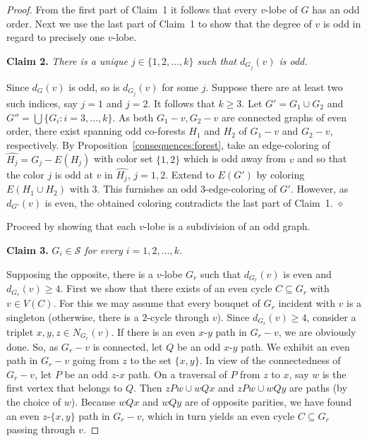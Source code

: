 \documentclass[a4paper,12pt]{article}
\numberwithin{equation}{section}
\begin{document}
\begin{proof}
From the first part of Claim~1 it follows that every $v$-lobe of $G$ has an odd order. Next we use the last part of Claim~1 to show that the degree of $v$ is odd in regard to precisely one $v$-lobe.


\bigskip

\noindent \textbf{Claim 2.} \textit{There is a unique $j\in\{1,2,\ldots,k\}$ such that $d_{G_j}(v)$ is odd.}

\medskip

\noindent Since $d_G(v)$ is odd, so is $d_{G_j}(v)$ for some $j$. Suppose there are at least two such indices, say $j=1$ and $j=2$. It follows that $k\geq3$. Let $G'=G_{1}\cup G_{2}$ and $G''=\bigcup\{G_i:i=3,\ldots,k\}$. As both $G_1-v,G_2-v$ are connected graphs of even order, there exist spanning odd co-forests $H_1$ and $H_2$ of $G_1-v$ and $G_2-v$, respectively. By Proposition~\ref{consequences:forest}, take an edge-coloring of $\hat{H_j}=G_j-E(H_j)$ with color set $\{1,2\}$ which is odd away from $v$ and so that the color $j$ is odd at $v$ in $\hat{H_j}$, $j=1,2$.
Extend to $E(G')$ by coloring $E(H_1\cup H_2)$ with $3$. This furnishes an odd $3$-edge-coloring of $G'$. However, as $d_{G'}(v)$ is even, the obtained coloring contradicts the last part of Claim~1. \hfill$\diamond$


\bigskip

Proceed by showing that each $v$-lobe is a subdivision of an odd graph.

\bigskip

\noindent \textbf{Claim 3.} \textit{$G_i\in \mathcal{S}$ for every $i=1,2,\ldots,k$.}

\medskip

\noindent Supposing the opposite, there is a $v$-lobe $G_r$ such that $d_{G_r}(v)$ is even and $d_{G_r}(v)\geq4$. First we show that there exists of an even cycle $C\subseteq G_r$ with $v\in V(C)$. For this we may assume that every bouquet of $G_r$ incident with $v$ is a singleton (otherwise, there is a $2$-cycle through $v$). Since $d_{G_r}(v)\geq4$, consider a triplet $x,y,z\in N_{G_r}(v)$. If there is an even $x$-$y$ path in $G_r-v$, we are obviously done. So, as $G_r-v$ is connected, let $Q$ be an odd $x$-$y$ path. We exhibit an even path in $G_r-v$ going from $z$ to the set $\{x,y\}$.  In view of the connectedness of $G_r-v$, let $P$ be an odd $z$-$x$ path. On a traversal of $P$ from $z$ to $x$, say $w$ is the first vertex that belongs to $Q$.  Then $zPw\cup wQx$ and $zPw\cup wQy$ are paths (by the choice of $w$). Because $wQx$ and $wQy$ are of opposite parities, we have found an even $z$-$\{x,y\}$ path in $G_r-v$, which in turn yields an even cycle $C\subseteq G_r$ passing through $v$.


\end{proof}
\end{document}
